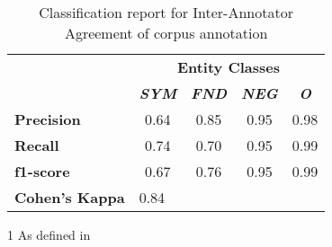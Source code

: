 \documentclass{article}
\newcommand{\myrowcolour}{\rowcolor[gray]{0.925}}
\begin{document}
\centering
\begin{table}
  \begin{threeparttable}
    \caption{Classification report for Inter-Annotator Agreement of corpus annotation}
     \begin{tabular}{l c c c c}

        {} & \multicolumn{4}{c}{\textbf{Entity Classes}\tnote{1}} \\
        \cmidrule[0.4pt](lr{1.2em}){2-5}%

        {} & {\bfseries \textit{SYM}} & {\bfseries \textit{FND}} & {\bfseries \textit{NEG}} & {\bfseries \textit{O}}\\
        \midrule
        \textbf{Precision} &  0.64 &  0.85 &  0.95 &  0.98 \\

        \textbf{Recall}    &  0.74 &  0.70 &  0.95 &  0.99 \\

        \midrule

          \textbf{f1-score}  &  0.67 &  0.76 &  0.95 &  0.99  \\
        \midrule
        \midrule
        \myrowcolour
        \textbf{Cohen's Kappa}    & \multicolumn{4}{l}{0.84} \\
        \bottomrule
    \end{tabular}
    \begin{tablenotes}
      \small
      \item[1] As defined in
    \end{tablenotes}
  \end{threeparttable}
\end{table}
\end{document}

